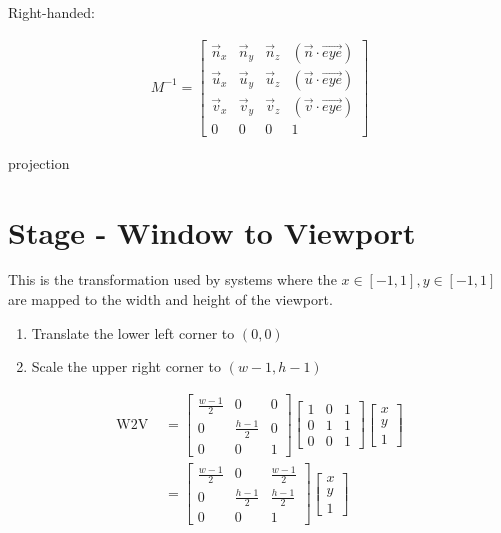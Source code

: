   Right-handed:

  \begin{align}
    M^{-1} =
    \begin{bmatrix}
      \vec{n}_{x} & \vec{n}_{y} & \vec{n}_{z} & \left( \vec{n} \cdot \vec{eye} \right) \\
      \vec{u}_{x} & \vec{u}_{y} & \vec{u}_{z} & \left( \vec{u} \cdot \vec{eye} \right) \\
      \vec{v}_{x} & \vec{v}_{y} & \vec{v}_{z} & \left( \vec{v} \cdot \vec{eye} \right) \\
      0 & 0 & 0 & 1
    \end{bmatrix}
  \end{align}

{projection}

\section{Stage - Window to Viewport}

  This is the transformation used by systems where the
  $ x \in \left[ -1, 1 \right], y \in \left[ -1, 1 \right] $ are mapped to
  the width and height of the viewport.

  \begin{enumerate}
    \item Translate the lower left corner to $ \left( 0, 0 \right) $
    \item Scale the upper right corner to $ \left( w - 1, h - 1 \right) $
  \end{enumerate}

  \begin{align}
    \text{W2V } &=
    \begin{bmatrix}
      \frac{w - 1}{2} & 0 & 0 \\
      0 & \frac{h - 1}{2} & 0 \\
      0 & 0 & 1
    \end{bmatrix}
    \begin{bmatrix}
      1 & 0 & 1 \\
      0 & 1 & 1 \\
      0 & 0 & 1
    \end{bmatrix}
    \begin{bmatrix}
      x \\
      y \\
      1
    \end{bmatrix} \\
    &=
    \begin{bmatrix}
      \frac{w - 1}{2} & 0 & \frac{w - 1}{2} \\
      0 & \frac{h - 1}{2} & \frac{h - 1}{2} \\
      0 & 0 & 1
    \end{bmatrix}
    \begin{bmatrix}
      x \\
      y \\
      1
    \end{bmatrix}
  \end{align}


